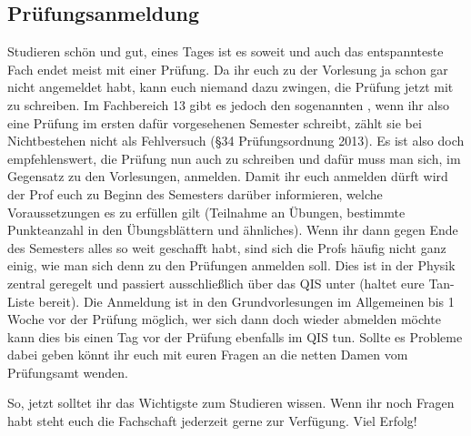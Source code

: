 \subsection{Prüfungsanmeldung}
Studieren schön und gut, eines Tages ist es soweit und auch das entspannteste Fach endet meist mit einer Prüfung. Da ihr euch zu der Vorlesung ja schon gar nicht angemeldet habt, kann euch niemand dazu zwingen, die Prüfung jetzt mit zu schreiben. Im Fachbereich 13 gibt es jedoch den sogenannten , wenn ihr also eine Prüfung im ersten dafür vorgesehenen Semester schreibt, zählt sie bei Nichtbestehen nicht als Fehlversuch (\S 34 Prüfungsordnung 2013). Es ist also doch empfehlenswert, die Prüfung nun auch zu schreiben und dafür muss man sich, im Gegensatz zu den Vorlesungen, anmelden. Damit ihr euch anmelden dürft wird der Prof euch zu Beginn des Semesters darüber informieren, welche Voraussetzungen es zu erfüllen gilt (Teilnahme an Übungen, bestimmte Punkteanzahl in den Übungsblättern und ähnliches). Wenn ihr dann gegen Ende des Semesters alles so weit geschafft habt, sind sich die Profs häufig nicht ganz einig, wie man sich denn zu den Prüfungen anmelden soll. Dies ist in der Physik zentral geregelt und passiert ausschließlich über das QIS unter  (haltet eure Tan-Liste bereit). Die Anmeldung ist in den Grundvorlesungen im Allgemeinen bis 1 Woche vor der Prüfung möglich, wer sich dann doch wieder abmelden möchte kann dies bis einen Tag vor der Prüfung ebenfalls im QIS tun. Sollte es Probleme dabei geben könnt ihr euch mit euren Fragen an die netten Damen vom Prüfungsamt wenden. \\
\par 
So, jetzt solltet ihr das Wichtigste zum Studieren wissen. Wenn ihr noch Fragen habt steht euch die Fachschaft jederzeit gerne zur Verfügung. Viel Erfolg! 

